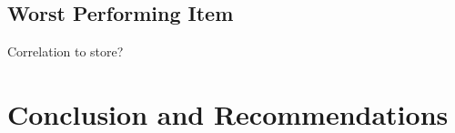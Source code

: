 \documentclass{article}
\begin{document}
            \subsection{Worst Performing Item}
                Correlation to store?




	\newpage
    \section{Conclusion and Recommendations}

    
\end{document}
